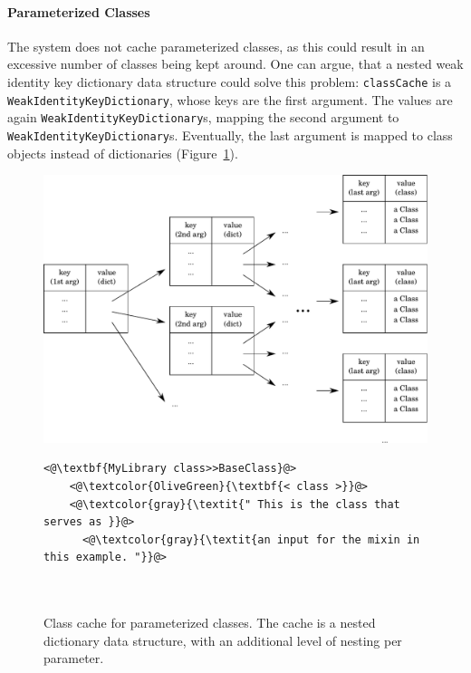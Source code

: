 \paragraph{Parameterized Classes}
The system does not cache parameterized classes, as this could result in an excessive number of classes being kept around. One can argue, that a nested weak identity key dictionary data structure could solve this problem: \texttt{classCache} is a \texttt{WeakIdentityKeyDictionary}, whose keys are the first argument. The values are again \texttt{WeakIdentityKeyDictionary}s, mapping the second argument to \texttt{WeakIdentityKeyDictionary}s. Eventually, the last argument is mapped to class objects instead of dictionaries (Figure~\ref{fig:impl_class_cache}).

\begin{figure}[!htp]
	\begin{minipage}{\textwidth}
	\includegraphics[width=\textwidth]{class_cache.pdf}
	\centering
	\caption[Class cache for parameterized classes]{Class cache for parameterized classes. The cache is a nested dictionary data structure, with an additional level of nesting per parameter.}
	\label{fig:impl_class_cache}
	\end{minipage}
	\begin{minipage}{\textwidth}
	\vspace{30pt}
	\begin{lstlisting}
<@\textbf{MyLibrary class>>BaseClass}@>
    <@\textcolor{OliveGreen}{\textbf{< class >}}@>
    <@\textcolor{gray}{\textit{" This is the class that serves as }}@>
      <@\textcolor{gray}{\textit{an input for the mixin in this example. "}}@>
	


\end{lstlisting}
\end{minipage}
\end{figure}
